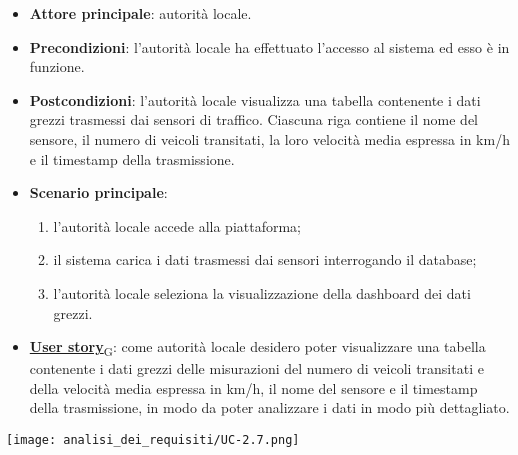 \begin{itemize}
	\item \textbf{Attore principale}: autorità locale.
	\item \textbf{Precondizioni}: l'autorità locale ha effettuato l'accesso al sistema ed esso è in funzione.
	\item \textbf{Postcondizioni}: l'autorità locale visualizza una tabella contenente i dati grezzi trasmessi dai sensori di traffico.
	      Ciascuna riga contiene il nome del sensore, il numero di veicoli transitati, la loro velocità media espressa in km/h e il timestamp della trasmissione.
	\item \textbf{Scenario principale}:
	      \begin{enumerate}
		      \item l'autorità locale accede alla piattaforma;
		      \item il sistema carica i dati trasmessi dai sensori interrogando il database;
		      \item l'autorità locale seleziona la visualizzazione della dashboard dei dati grezzi.
	      \end{enumerate}
	\item \href{https://7last.github.io/docs/rtb/documentazione-interna/glossario\#user-story}{\textbf{User story}\textsubscript{G}}:
	      come autorità locale desidero poter visualizzare una tabella contenente i dati grezzi delle misurazioni del numero di veicoli transitati
	      e della velocità media espressa in km/h, il nome del sensore e il timestamp della trasmissione, in modo da poter analizzare i dati in modo più dettagliato.
\end{itemize}
\begin{center}
	\texttt{[image: analisi\_dei\_requisiti/UC-2.7.png]}
\end{center}

